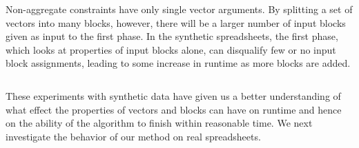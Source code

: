 Non-aggregate constraints have only single vector arguments.
By splitting a set of vectors into many blocks, however, there will be a larger number of input blocks given as input to the first phase. 
In the synthetic spreadsheets, the first phase, which looks at properties of input blocks alone, can disqualify few or no input block assignments, leading to some increase in runtime as more blocks are added.





$ $

\noindent 
These experiments with synthetic data have given us a better understanding of what effect the properties of vectors and blocks can have on runtime and hence on the ability of the algorithm to finish within reasonable time. We next investigate the behavior of our method on real spreadsheets.



